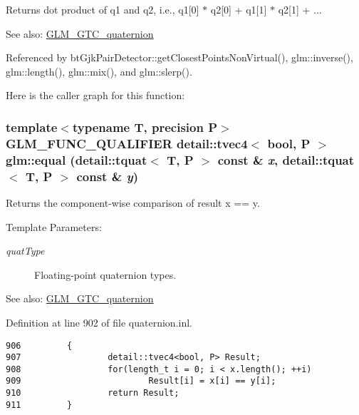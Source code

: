 Returns dot product of q1 and q2, i.e., q1\mbox{[}0\mbox{]} $\ast$ q2\mbox{[}0\mbox{]} + q1\mbox{[}1\mbox{]} $\ast$ q2\mbox{[}1\mbox{]} + ...

\begin{Desc}
\item[See also:]\hyperlink{group__gtc__quaternion}{GLM\_\-GTC\_\-quaternion} \end{Desc}


Referenced by btGjkPairDetector::getClosestPointsNonVirtual(), glm::inverse(), glm::length(), glm::mix(), and glm::slerp().

Here is the caller graph for this function:\hypertarget{group__gtc__quaternion_gd867dac3fe25c96ee0cc95a141acd4db}{
\subsubsection[equal]{\setlength{\rightskip}{0pt plus 5cm}template$<$typename T, precision P$>$ GLM\_\-FUNC\_\-QUALIFIER detail::tvec4$<$ bool, P $>$ glm::equal (detail::tquat$<$ T, P $>$ const \& {\em x}, \/  detail::tquat$<$ T, P $>$ const \& {\em y})}}
\label{group__gtc__quaternion_gd867dac3fe25c96ee0cc95a141acd4db}


Returns the component-wise comparison of result x == y.

\begin{Desc}
\item[Template Parameters:]
\begin{description}
\item[{\em quatType}]Floating-point quaternion types.\end{description}
\end{Desc}
\begin{Desc}
\item[See also:]\hyperlink{group__gtc__quaternion}{GLM\_\-GTC\_\-quaternion} \end{Desc}


Definition at line 902 of file quaternion.inl.

\begin{Code}\begin{verbatim}906         {
907                 detail::tvec4<bool, P> Result;
908                 for(length_t i = 0; i < x.length(); ++i)
909                         Result[i] = x[i] == y[i];
910                 return Result;
911         }
\end{verbatim}
\end{Code}


